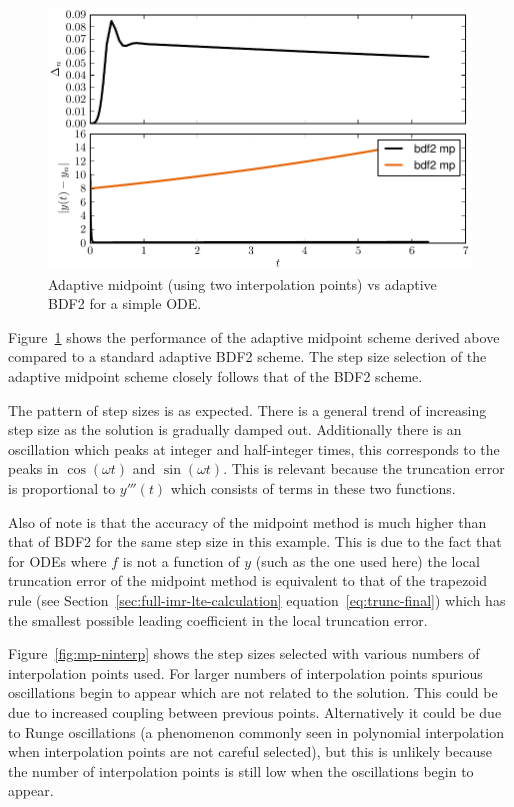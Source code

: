 \begin{figure}[ht!]
  \centering
  \includegraphics{images/bdf2_vs_mp}
  \caption{Adaptive midpoint (using two interpolation points) vs adaptive BDF2 for a simple ODE.}
  \label{fig:mp-vs-bdf2}
\end{figure}

Figure~\ref{fig:mp-vs-bdf2} shows the performance of the adaptive midpoint scheme derived above compared to a standard adaptive BDF2 scheme.\cite{Gresho-Sani} %
The step size selection of the adaptive midpoint scheme closely follows that of the BDF2 scheme.

The pattern of step sizes is as expected.
There is a general trend of increasing step size as the solution is gradually damped out.
Additionally there is an oscillation which peaks at integer and half-integer times, this corresponds to the peaks in $\cos(\omega t)$ and $\sin(\omega t)$.
This is relevant because the truncation error is proportional to $y'''(t)$ which consists of terms in these two functions.

Also of note is that the accuracy of the midpoint method is much higher than that of BDF2 for the same step size in this example.
This is due to the fact that for ODEs where $f$ is not a function of $y$ (such as the one used here) the local truncation error of the midpoint method is equivalent to that of the trapezoid rule (see Section~\ref{sec:full-imr-lte-calculation} equation~\eqref{eq:trunc-final}) which has the smallest possible leading coefficient in the local truncation error.\cite{Gresho-Sani} %


Figure~\ref{fig:mp-ninterp} shows the step sizes selected with various numbers of interpolation points used.
For larger numbers of interpolation points spurious oscillations begin to appear which are not related to the solution.
This could be due to increased coupling between previous points.
Alternatively it could be due to Runge oscillations (a phenomenon commonly seen in polynomial interpolation when interpolation points are not careful selected), but this is unlikely because the number of interpolation points is still low when the oscillations begin to appear.

